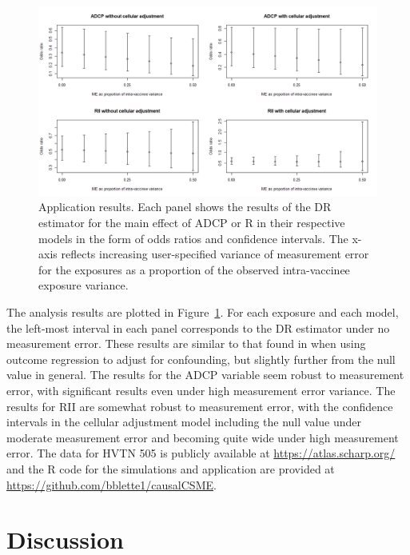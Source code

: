 \documentclass[useAMS,usenatbib,referee]{biom}
\newcommand{\RNum}[1]{\uppercase\expandafter{\romannumeral #1\relax}}
\begin{document}
\begin{figure}[h!]
\centering
\includegraphics[width=5.9in]{Figure2.png}
\caption{Application results. Each panel shows the results of the DR estimator for the main effect of ADCP or R\RNum{2} in their respective models in the form of odds ratios and confidence intervals. The x-axis reflects increasing user-specified variance of measurement error for the exposures as a proportion of the observed intra-vaccinee exposure variance.}
\label{fig:two}
\end{figure}

The analysis results are plotted in Figure~\ref{fig:two}. For each exposure and each model, the left-most interval in each panel corresponds to the DR estimator under no measurement error. These results are similar to that found in \citet{neidich2019} when using outcome regression to adjust for confounding, but slightly further from the null value in general. The results for the ADCP variable seem robust to measurement error, with significant results even under high measurement error variance. The results for RII are somewhat robust to measurement error, with the confidence intervals in the cellular adjustment model including the null value under moderate measurement error and becoming quite wide under high measurement error. The data for HVTN 505 is publicly available at \href{https://atlas.scharp.org/cpas/project/HVTN\%20Public\%20Data/HVTN\%20505/begin.view?}{https://atlas.scharp.org/} and the R code for the simulations and application are provided at \href{https://github.com/bblette1/causalCSME}{https://github.com/bblette1/causalCSME}.

\section{Discussion}
\end{document}
